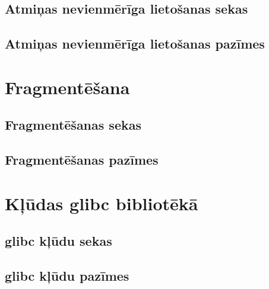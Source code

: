 \subsection{Atmiņas nevienmērīga lietošanas sekas}
\subsection{Atmiņas nevienmērīga lietošanas pazīmes}

\section{Fragmentēšana}
\subsection{Fragmentēšanas sekas}
\subsection{Fragmentēšanas pazīmes}

\section{Kļūdas glibc bibliotēkā}
\subsection{glibc kļūdu sekas}
\subsection{glibc kļūdu pazīmes}

